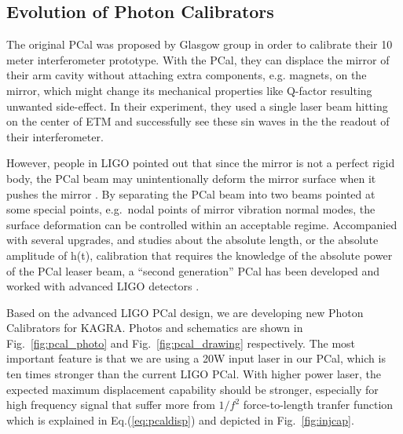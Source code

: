 \subsection{Evolution of Photon Calibrators}


The original PCal was proposed by Glasgow group \cite{pcal:clubley2001} in order to calibrate their 10 meter interferometer prototype. With the PCal, they can displace the mirror of their arm cavity without attaching extra components, e.g. magnets, on the mirror, which might change its mechanical properties like Q-factor resulting unwanted side-effect. In their experiment, they used a single laser beam hitting on the center of ETM and successfully see these sin waves in the the readout of their interferometer. 

However, people in LIGO pointed out that since the mirror is not a perfect rigid body, the PCal beam may unintentionally deform the mirror surface when it pushes the mirror \cite{pcal:Daveloza2012}. By separating the PCal beam into two beams pointed at some special points, e.g.~nodal points of mirror vibration normal modes, the surface deformation can be controlled within an acceptable regime\cite{pcal:Daveloza2012}. Accompanied with several upgrades, and studies about the absolute length, or the absolute amplitude of h(t), calibration that requires the knowledge of the absolute power of the PCal leaser beam, a ``second generation'' PCal has been developed and worked with advanced LIGO detectors \cite{pcal:karki2016}.
 
Based on the advanced LIGO PCal design, we are developing new Photon Calibrators for KAGRA. Photos and schematics are shown in Fig.~\ref{fig:pcal_photo} and Fig.~\ref{fig:pcal_drawing} respectively. The most important feature is that we are using a 20W input laser in our PCal, which is ten times stronger than the current LIGO PCal. With higher power laser, the expected maximum displacement capability should be stronger, especially for high frequency signal that suffer more from $1/f^2$ force-to-length tranfer function which is explained in Eq.(\ref{eq:pcaldisp}) and depicted in Fig.~\ref{fig:injcap}. 
 
